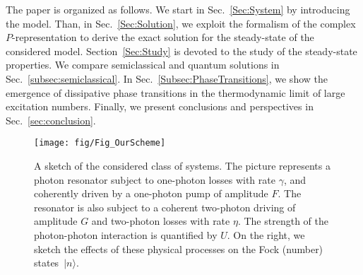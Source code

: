 The paper is organized as follows.
We start in Sec.~\ref{Sec:System} by introducing the model.
Than, in Sec.~\ref{Sec:Solution}, we exploit the formalism of the complex $P$-representation to derive the exact solution for the steady-state of the considered model.
Section~\ref{Sec:Study} is devoted to the study of the steady-state properties.
We compare semiclassical and quantum solutions in Sec.~\ref{subsec:semiclassical}.
In Sec.~\ref{Subsec:PhaseTransitions}, we show the emergence of dissipative phase transitions in the thermodynamic limit of large excitation numbers.
Finally, we present conclusions and perspectives in Sec.~\ref{sec:conclusion}.



\begin{figure}[t!]
	\texttt{[image: fig/Fig\_OurScheme]}
	\caption{A sketch of the considered class of systems.
	The picture represents a photon resonator subject to one-photon losses with rate $\gamma$, and coherently driven by a one-photon pump of amplitude $F$.
	The resonator is also subject to a coherent two-photon driving of amplitude $G$ and two-photon losses with rate $\eta$.
	The strength of the photon-photon interaction is quantified by $U$.
	On the right, we sketch the effects of these physical processes on the Fock (number) states~$\vert n \rangle$.}
\label{fig:syst_ph}

\end{figure}

